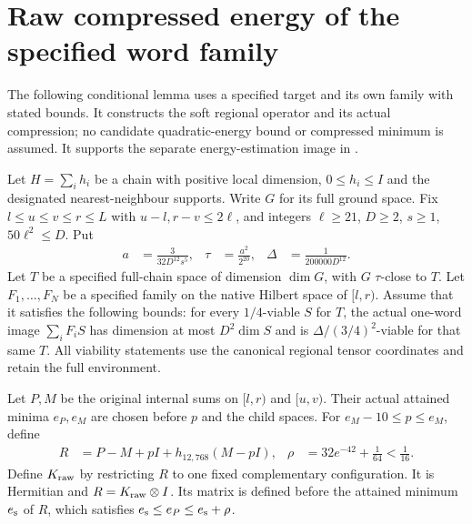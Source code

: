 \section{Raw compressed energy of the specified word family}

The following conditional lemma uses a specified target and its own
family with stated bounds. It constructs the soft regional operator and its actual
compression; no candidate quadratic-energy bound or compressed minimum is assumed.
It supports the separate energy-estimation image in
\cite[Figure \texttt{fig:algo1}, line 1631]{Arad2016RigorousRG}.

\begin{lemma}
    \label{lem:soft_same_word_compressed_energy}
    \leanok
    Let $H=\sum_i h_i$ be a chain with positive local dimension,
    $0\le h_i\le I$ and the designated nearest-neighbour supports.
    Write $G$ for its full ground space. Fix $l\le u\le v\le r\le L$
    with $u-l,r-v\le2\ell$, and integers
    $\ell\ge21$, $D\ge2$, $s\ge1$, $50\ell^2\le D$. Put
    \begin{align}
        a      & =\frac{3}{32D^{12}s^5},  &
        \tau   & =\frac{a^2}{2^{20}},     &
        \Delta & =\frac{1}{200000D^{12}}.
    \end{align}
    Let $T$ be a specified full-chain space of dimension $\dim G$,
    with $G$ $\tau$-close to $T$. Let $F_1,\ldots,F_N$ be a specified
    family on the native Hilbert space of $[l,r)$. Assume that it satisfies the following
    bounds: for every $1/4$-viable $S$ for $T$, the actual one-word
    image $\sum_iF_iS$ has dimension at most $D^2\dim S$ and is
    $\Delta/(3/4)^2$-viable for that same $T$. All viability statements
    use the canonical regional tensor coordinates and retain the full
    environment.

    Let $P,M$ be the original internal sums on $[l,r)$ and $[u,v)$.
    Their actual attained minima $e_P,e_M$ are chosen before $p$ and the
    child spaces. For $e_M-10\le p\le e_M$, define
    \begin{align}
        R    & =P-M+pI+h_{12,768}(M-pI),         &
        \rho & =32e^{-42}+\frac1{64}<\frac1{16}.
        \label{eq:soft_word_raw_operator}
    \end{align}
    Define $K_{\rm raw}$ by restricting $R$ to one fixed complementary
    configuration. It is Hermitian and $R=K_{\rm raw}\otimes I$.
    Its matrix is defined before the attained minimum $e_{\rm s}$ of
    $R$, which satisfies $e_{\rm s}\le e_P\le e_{\rm s}+\rho$.


\end{lemma}
